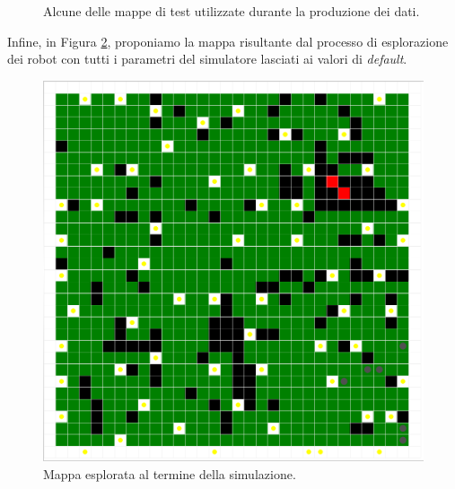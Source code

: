 \begin{figure}
	\hfill
	\caption{Alcune delle mappe di test utilizzate durante la produzione dei dati.}
	\label{fig:maps}
\end{figure}
Infine, in Figura \ref{fig:explored}, proponiamo la mappa risultante dal processo di esplorazione dei robot con tutti i parametri del simulatore lasciati ai valori di \textit{default}.
\begin{figure}
	\centering
	\includegraphics[width=0.8\linewidth]{images/explored}
	\caption{Mappa esplorata al termine della simulazione.}
	\label{fig:explored}
\end{figure}
